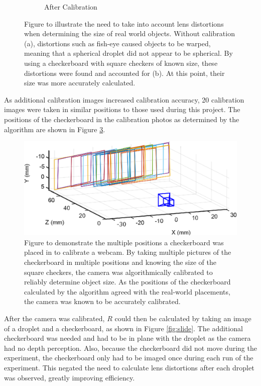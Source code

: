 \documentclass{physics_article_B}
\begin{document}
\begin{figure}[H]
\begin{subfigure}[b]{0.48\textwidth}
                        \caption{After Calibration}
                        \label{fig:calibsetup:undistorted}
                    \end{subfigure}
                    \caption{Figure to illustrate the need to take into account lens distortions when determining the size of real world objects. Without calibration (a), distortions such as fish-eye caused objects to be warped, meaning that a spherical droplet did not appear to be spherical. By using a checkerboard with square checkers of known size, these distortions were found and accounted for (b). At this point, their size was more accurately calculated. }\label{fig:calibsetup}
                \end{figure}
                
             As additional calibration images increased calibration accuracy, 20 calibration images were taken in similar positions to those used during this project. The positions of the checkerboard in the calibration photos as determined by the algorithm are shown in Figure \ref{fig:calib}. 
            \vspace{0.5cm}
                \begin{figure}[H]
                    \centering\includegraphics[scale=0.93]{Figures/CameraExtrinsics.eps}
                    \caption{Figure to demonstrate the multiple positions a checkerboard was placed in to calibrate a webcam. By taking multiple pictures of the checkerboard in multiple positions and knowing the size of the square checkers, the camera was algorithmically calibrated to reliably determine object size. As the positions of the checkerboard calculated by the algorithm agreed with the real-world placements, the camera was known to be accurately calibrated.}\label{fig:calib}
                \end{figure}
            
            \newpage After the camera was calibrated, $R$ could then be calculated by taking an image of a droplet and a checkerboard, as shown in Figure \ref{fig:slide}. The additional checkerboard was needed and had to be in plane with the droplet as the camera had no depth perception. Also, because the checkerboard did not move during the experiment, the checkerboard only had to be imaged once during each run of the experiment. This negated the need to calculate lens distortions after each droplet was observed, greatly improving efficiency. 
            
\end{document}
